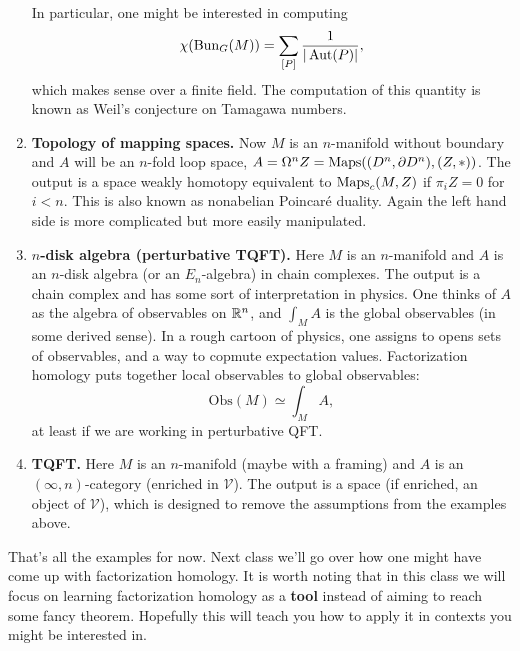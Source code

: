 \documentclass{amsart}
\begin{document}
\begin{enumerate}
        In particular, one might be interested in computing
        \begin{equation*}
            \chi(\text{Bun}_G(M)) = \sum_{[P]}\frac{1}{|\operatorname{Aut}(P)|},
        \end{equation*}
        which makes sense over a finite field. The computation of this quantity is
        known as Weil's conjecture on Tamagawa numbers.

    \item \textbf{Topology of mapping spaces.} Now $M$ is an $n$-manifold without boundary and $A$ will be an
        $n$-fold loop space, $A=\Omega^nZ=\operatorname{Maps}( (D^n,\partial D^n),(Z,*))$. The
        output is a space weakly homotopy equivalent to $\operatorname{Maps}_c(M,Z)$ if $\pi_iZ=0$ for $i<n$.
        This is also known as nonabelian Poincar\'e duality. Again the left hand
        side is more complicated but more easily manipulated.

    \item \textbf{$n$-disk algebra (perturbative TQFT).}
        Here $M$ is an $n$-manifold and $A$ is an $n$-disk algebra (or an $E_n$-algebra)
        in chain complexes. The output is a chain complex and has some sort of interpretation
        in physics. One thinks of $A$ as the algebra of observables on $\mathbb{R}^n$, and
        $\int_M A$ is the global observables (in some derived sense). In a rough
        cartoon of physics, one assigns to opens sets of observables, and a way to copmute
        expectation values. Factorization homology puts together local observables to global
        observables:
        \begin{equation*}
            \text{Obs}(M) \simeq \int_M A,
        \end{equation*}
        at least if we are working in perturbative QFT.

    \item \textbf{TQFT.} Here $M$ is an $n$-manifold (maybe with a framing) and $A$ is an
        $(\infty,n)$-category (enriched in $\mathcal{V}$).
        The output is a space (if enriched, an object of $\mathcal{V}$), which
        is designed to remove the assumptions from the examples above.
\end{enumerate}

That's all the examples for now. Next class we'll go over how one might have come up
with factorization homology. It is worth noting that in this class we will focus
on learning factorization homology as a \textbf{tool} instead of aiming to reach
some fancy theorem. Hopefully this will teach you how to apply it in contexts you
might be interested in.
\end{document}
